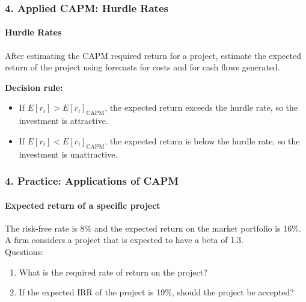 \documentclass{beamer}
\begin{document}
\begin{frame}[t]
    \frametitle{4. Applied CAPM: Hurdle Rates}
    \framesubtitle{Hurdle Rates}

    After estimating the CAPM required return for a project, estimate
    the expected return of the project using forecasts for costs and for cash flows generated.

    \vspace{1em}

    \textbf{Decision rule:}

    \begin{itemize}
        \item If $E[r_i] > E[r_i]_{\text{CAPM}}$, the expected return
        exceeds the hurdle rate, so the investment is attractive.
        
        \item If $E[r_i] < E[r_i]_{\text{CAPM}}$, the expected return
        is below the hurdle rate, so the investment is unattractive.
    \end{itemize}


\end{frame}

\begin{practiceframe}[t]
    \frametitle{4. Practice: Applications of CAPM}
    \framesubtitle{Expected return of a specific project}

    The risk-free rate is 8\% and the expected return on the market portfolio is 16\%. 
    A firm considers a project that is expected to have a beta of 1.3.\\
    \vspace{1em}
    Questions:
    \begin{enumerate}
        \item What is the required rate of return on the project?
        \item If the expected IRR of the project is 19\%, should the project be accepted?
    \end{enumerate}
    \vfill
 
\end{practiceframe}
\end{document}

